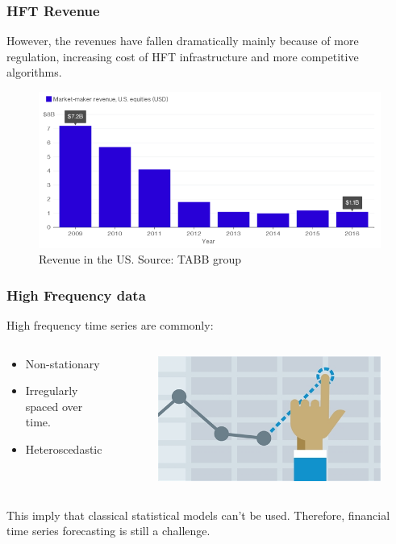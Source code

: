 \documentclass{beamer}
\begin{document}
\begin{frame}
\frametitle{HFT Revenue}
However, the revenues have fallen dramatically mainly because of more regulation, increasing cost of HFT infrastructure and more competitive algorithms.
\begin{figure}
\includegraphics[width=0.7\paperwidth]{img/HFTmarket2}
\caption{Revenue in the US. Source: TABB group}
\end{figure}
\end{frame}


\begin{frame}
\frametitle{High Frequency data}
High frequency time series are commonly:
\begin{columns}
\begin{column}{0.5\textwidth}
\begin{itemize}
\item Non-stationary
\item Irregularly spaced over time.
\item Heteroscedastic
\end{itemize}
\end{column}
\begin{column}{0.5\textwidth}
\begin{figure}
\includegraphics[width=0.35\paperwidth]{img/forecast}
\end{figure}
\end{column}
\end{columns}
\vspace{5mm}
This imply that classical statistical models can't be used. Therefore, financial time series forecasting is still a challenge.
\end{frame}
\end{document}
